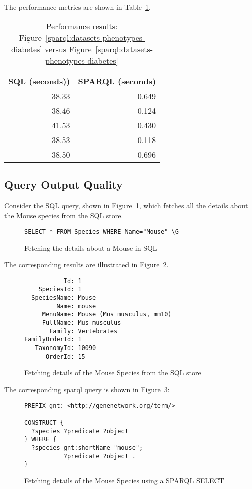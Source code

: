 The performance metrics are shown in Table~\ref{table:perf-3}.

\begin{table}[H]
\begin{tabular}{rr}
SQL (seconds)) & SPARQL (seconds)\\[0pt]
\toprule
38.33 & 0.649\\[0pt]
38.46 & 0.124\\[0pt]
41.53 & 0.430\\[0pt]
38.53 & 0.118\\[0pt]
38.50 & 0.696\\[0pt]
\end{tabular}
\caption{Performance results: Figure~\ref{sparql:datasets-phenotypes-diabetes} versus Figure~\ref{sparql:datasets-phenotypes-diabetes} }\label{table:perf-3}
\end{table}

\subsection{Query Output Quality}

Consider the SQL query, shown in Figure~\ref{sql:mouse}, which fetches all the details about the Mouse species from the SQL store.

\begin{figure}[H]
\centering
\begin{verbatim}
SELECT * FROM Species WHERE Name="Mouse" \G
\end{verbatim}
\caption{Fetching the details about a Mouse in SQL}\label{sql:mouse}
\end{figure}

The corresponding results are illustrated in Figure~\ref{sql:mouse-results}.

\begin{figure}[H]
\centering
\begin{verbatim}
           Id: 1
    SpeciesId: 1
  SpeciesName: Mouse
         Name: mouse
     MenuName: Mouse (Mus musculus, mm10)
     FullName: Mus musculus
       Family: Vertebrates
FamilyOrderId: 1
   TaxonomyId: 10090
      OrderId: 15
\end{verbatim}
\caption{Fetching details of the Mouse Species from the SQL store}\label{sql:mouse-results}
\end{figure}

The corresponding sparql query is shown in Figure~\ref{sparql:mouse}:

\begin{figure}[H]
\centering
\begin{verbatim}
PREFIX gnt: <http://genenetwork.org/term/>

CONSTRUCT {
  ?species ?predicate ?object
} WHERE {
  ?species gnt:shortName "mouse";
           ?predicate ?object .
}
\end{verbatim}
\caption{Fetching details of the Mouse Species using a SPARQL SELECT}\label{sparql:mouse}
\end{figure}

